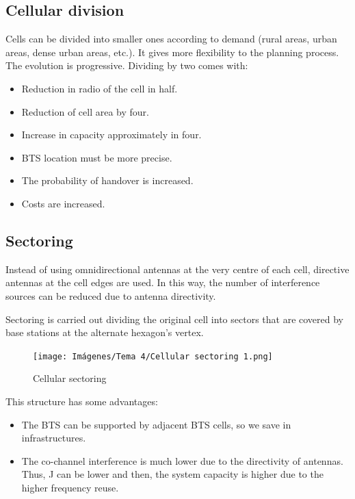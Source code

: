 \documentclass[
	12pt,
	twoside
]{book}
\begin{document}
\subsection{Cellular division}

Cells can be divided into smaller ones according to demand (rural areas, urban areas, dense urban areas, etc.). It gives more flexibility to the planning process. The evolution is progressive. Dividing by two comes with:

\begin{itemize}
	\item Reduction in radio of the cell in half.
	\item Reduction of cell area by four.
	\item Increase in capacity approximately in four.
	\item BTS location must be more precise.
	\item The probability of handover is increased.
	\item Costs are increased.
\end{itemize}

\subsection{Sectoring}

Instead of using omnidirectional antennas at the very centre of each cell, directive antennas at the cell edges are used. In this way, the number of interference sources can be reduced due to antenna directivity.

Sectoring is carried out dividing the original cell into sectors that are covered by base stations at the alternate hexagon’s vertex.

\begin{figure}[H]
	\centering
	\texttt{[image: Imágenes/Tema 4/Cellular sectoring 1.png]}
	\caption{
		\label{fig:unit4_cell_sect_1}
		Cellular sectoring
	}
\end{figure}

This structure has some advantages:

\begin{itemize}
	\item The BTS can be supported by adjacent BTS cells, so we save in infrastructures.
	\item The co-channel interference is much lower due to the directivity of antennas. Thus, J can be lower and then, the system capacity is higher due to the higher frequency reuse.
\end{itemize}
\end{document}
